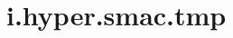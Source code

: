 \chapter{i.\+hyper.\+smac.\+tmp}
\hypertarget{md_i_8hyper_8smac_8tmp}{}\label{md_i_8hyper_8smac_8tmp}
